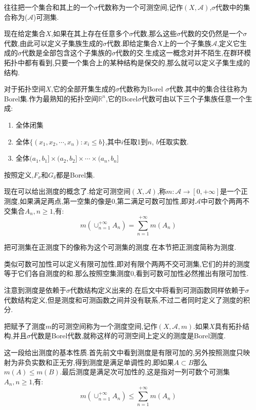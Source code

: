 往往把一个集合和其上的一个$\sigma$代数称为一个可测空间,记作$(X,\mathscr{A})$,$\sigma$代数中的集合称为($\mathscr{A}$)可测集.

现在给定集合$X$,如果在其上存在任意多个$\sigma$代数,那么这些$\sigma$代数的交仍然是一个$\sigma$代数,由此可以定义子集族生成的$\sigma$代数.即给定集合$X$上的一个子集族$\mathscr{A}$,定义它生成的$\sigma$代数是全部包含这个子集族的$\sigma$代数的交.生成这一概念对并不陌生,在群环模拓扑中都有看到,只要一个集合上的某种结构是保交的,那么就可以定义子集生成的结构.

对于拓扑空间$X$,它的全部开集生成的$\sigma$代数称为Borel $\sigma$代数.其中的集合往往称为Borel集.作为最熟知的拓扑空间$\mathbb{R}^n$,它的Borel$\sigma$代数可由以下三个子集族任意一个生成:
\begin{enumerate}
  \item 全体闭集
  \item 全体$\{(x_1,x_2,\cdots,x_n):x_i\le b\}$,其中$i$任取1到$n$, $b$任取实数.
  \item 全体$(a_1,b_1]\times(a_2,b_2]\times\cdots\times(a_n,b_n]$
\end{enumerate}

按照定义,$F_{\sigma}$和$G_{\delta}$都是Borel集.

现在可以给出测度的概念了.给定可测空间$(X,\mathscr{A})$,称$m:\mathscr{A}\to[0,+\infty]$是一个正测度,如果满足两点,第一空集的像是0,第二满足可数可加性,即对$\mathscr{A}$中可数个两两不交集合$A_n,n\ge1$,有:
$$m\left(\cup_{n=1}^{+\infty}A_n\right)=\sum_{n=1}^{+\infty}m(A_n)$$

把可测集在正测度下的像称为这个可测集的测度.在本节把正测度简称为测度.

类似可数可加性可以定义有限可加性,即对有限个两两不交可测集,它们的并的测度等于它们各自测度的和.那么按照空集测度0,看到可数可加性必然推出有限可加性.

注意到测度是依赖于$\sigma$代数结构定义出来的.在后文中将看到可测函数同样依赖于$\sigma$代数结构定义,但是测度和可测函数之间并没有联系,不过二者同时定义了测度的积分.

把赋予了测度$m$的可测空间称为一个测度空间,记作$(X,\mathscr{A},m)$.如果$X$具有拓扑结构,并且$ \sigma$代数是Borel代数,就称这样的可测空间上定义的测度是Borel测度.

这一段给出测度的基本性质.首先前文中看到测度是有限可加的,另外按照测度只映射为非负实数和正无穷,得到测度是满足单调性的,即如果$A\subset B$那么$m(A)\le m(B)$.最后测度是满足次可加性的,这是指对一列可数个可测集$A_n,n\ge1$,有:
$$m\left(\cup_{n=1}^{+\infty}A_n\right)\le\sum_{n=1}^{+\infty}m(A_n)$$

